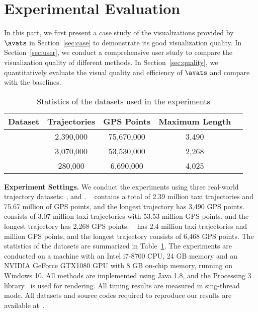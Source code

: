 \section{Experimental Evaluation}\label{sec:exp}

In this part, we first present a case study of the visualizations provided by $\avats$ in Section~\ref{sec:case} to demonstrate its good visualization quality. In Section~\ref{sec:user}, we conduct a comprehensive user study to compare the visualization quality of different methods. In Section~\ref{sec:quality}, we quantitatively evaluate the visual quality and efficiency of $\avats$ and compare with the baselines.     

\begin{table}
	\centering
	\small
	\caption{Statistics of the datasets used in the experiments}
	\begin{tabular}{|c|c|c|c|c|} \hline
		\textbf{Dataset} & \textbf{Trajectories} & \textbf{GPS Points} & \textbf{Maximum Length}\\ \hline
		\pt{}& 2,390,000 & 75,670,000 & 3,490 \\ \hline
		\sz{}& 3,070,000 & 53,530,000 & 2,268 \\ \hline
		\cd{}& 280,000 & 6,690,000 & 4,025 \\ \hline
	\end{tabular}	\label{tab:dataset}
\end{table}


\vspace{1mm}
\noindent\textbf{Experiment Settings.} We conduct the experiments 
using three real-world trajectory datasets: \pt{}, \sz{} and \cd{}.
\pt{}~\cite{pt} contains a total of 2.39 million taxi trajectories and 75.67 million of GPS points, and the longest trajectory has 3,490 GPS points.
\sz{}~\cite{sz} consists of 3.07 million taxi trajectories with 53.53 million GPS points, and the longest trajectory has 2,268 GPS points. 
\cd{}~\cite{cd} has 2.4 million taxi trajectories and  million GPS points, and the longest trajectory consists of 6,468 GPS points. The statistics of the datasets are summarized in Table~\ref{tab:dataset}. The experiments are conducted on a machine with an Intel i7-8700 CPU, 24 GB memory and an NVIDIA GeForce GTX1080 GPU with 8 GB on-chip memory, running on Windows 10. All methods are implemented using Java 1.8, and the Processing 3 library~\cite{p3} is used for rendering. All timing results are measured in sing-thread mode. All datasets and source codes required to reproduce our results are available at~\cite{code}.

